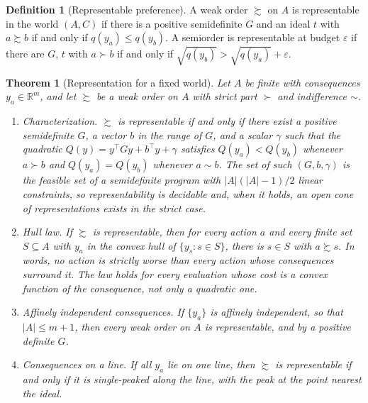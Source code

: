 \documentclass[11pt]{article}
\newtheorem{theorem}{Theorem}
\theoremstyle{definition}
\newtheorem{definition}{Definition}
\theoremstyle{remark}
\newcommand{\R}{\mathbb{R}}
\begin{document}
\begin{definition}[Representable preference]
\label{def:repr}
A weak order $\succsim$ on $A$ is representable in the world $(A,C)$ if there is a positive semidefinite $G$ and an ideal $t$ with $a\succsim b$ if and only if $q(y_{a})\le q(y_{b})$.
A semiorder is representable at budget $\varepsilon$ if there are $G$, $t$ with $a\succ b$ if and only if $\sqrt{q(y_{b})}>\sqrt{q(y_{a})}+\varepsilon$.
\end{definition}

\begin{theorem}[Representation for a fixed world]
\label{thm:repr}
Let $A$ be finite with consequences $y_{a}\in\R^{m}$, and let $\succsim$ be a weak order on $A$ with strict part $\succ$ and indifference $\sim$.
\begin{enumerate}
\item[(a)] \emph{Characterization.} $\succsim$ is representable if and only if there exist a positive semidefinite $G$, a vector $b$ in the range of $G$, and a scalar $\gamma$ such that the quadratic $Q(y)=y^{\top}Gy+b^{\top}y+\gamma$ satisfies $Q(y_{a})<Q(y_{b})$ whenever $a\succ b$ and $Q(y_{a})=Q(y_{b})$ whenever $a\sim b$. The set of such $(G,b,\gamma)$ is the feasible set of a semidefinite program with $|A|(|A|-1)/2$ linear constraints, so representability is decidable and, when it holds, an open cone of representations exists in the strict case.
\item[(b)] \emph{Hull law.} If $\succsim$ is representable, then for every action $a$ and every finite set $S\subseteq A$ with $y_{a}$ in the convex hull of $\{y_{s}:s\in S\}$, there is $s\in S$ with $a\succsim s$. In words, no action is strictly worse than every action whose consequences surround it. The law holds for every evaluation whose cost is a convex function of the consequence, not only a quadratic one.
\item[(c)] \emph{Affinely independent consequences.} If $\{y_{a}\}$ is affinely independent, so that $|A|\le m+1$, then every weak order on $A$ is representable, and by a positive definite $G$.
\item[(d)] \emph{Consequences on a line.} If all $y_{a}$ lie on one line, then $\succsim$ is representable if and only if it is single-peaked along the line, with the peak at the point nearest the ideal.
\end{enumerate}
\end{theorem}
\end{document}
